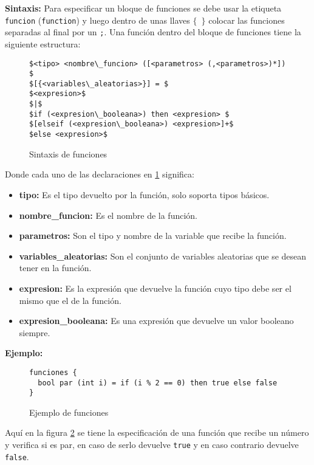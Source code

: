\textbf{Sintaxis:} Para especificar un bloque de funciones se debe usar la etiqueta 
\texttt{funcion} (\texttt{function}) y luego dentro de unas llaves \texttt{$\{$ $\}$} colocar 
las funciones separadas al final por un \texttt{;}. Una función dentro del bloque de 
funciones tiene la siguiente estructura: 

\begin{figure}[h]
\begin{lstlisting}[mathescape]
$<tipo> <nombre\_funcion> ([<parametros> (,<parametros>)*]) $
$[{<variables\_aleatorias>}] = $
$<expresion>$ 
$|$ 
$if (<expresion\_booleana>) then <expresion> $ 
$[elseif (<expresion\_booleana>) <expresion>]+$ 
$else <expresion>$ 
\end{lstlisting}
\caption[Sintaxis de funciones]
{Sintaxis de funciones}
\label{sintaxis_funciones}
\end{figure}

Donde cada uno de las declaraciones en \ref{sintaxis_funciones} significa:
\begin{itemize}
 \item {\textbf{tipo:} Es el tipo devuelto por la función, solo soporta tipos
  básicos.}
 \item {\textbf{nombre\_funcion:} Es el nombre de la función.}
 \item {\textbf{parametros:} Son el tipo y nombre de la variable que recibe la 
  función.}
 \item {\textbf{variables\_aleatorias:} Son el conjunto de variables aleatorias 
  que se desean tener en la función.}
 \item {\textbf{expresion:} Es la expresión que devuelve la función cuyo tipo 
  debe ser el mismo que el de la función.}
 \item {\textbf{expresion\_booleana:} Es una expresión que devuelve un valor 
  booleano siempre.}
\end{itemize}

\textbf{Ejemplo:}
\begin{figure}[h]
\begin{lstlisting}[mathescape]
funciones {
  bool par (int i) = if (i % 2 == 0) then true else false
}
\end{lstlisting}
\caption[Ejemplo de funciones]
{Ejemplo de funciones}
\label{ejemplo_funciones}
\end{figure}

Aquí en la figura \ref{ejemplo_funciones} se tiene la especificación de una 
función que recibe un número y verifica si es par, en caso de serlo devuelve 
\texttt{true} y en caso contrario devuelve \texttt{false}.

